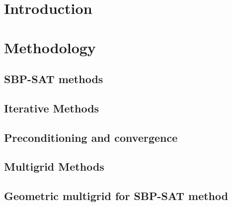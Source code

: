 \chapter{Introduction}



\chapter{Methodology}

\section{SBP-SAT methods}

\section{Iterative Methods}

\section{Preconditioning and convergence}

\section{Multigrid Methods}

\section{Geometric multigrid for SBP-SAT method}

